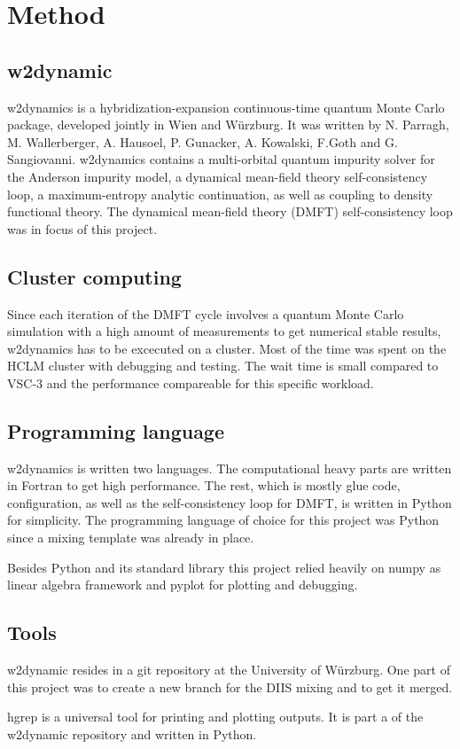 \chapter{Method}
\label{ch:method}

\section{w2dynamic}

w2dynamics\cite{w2dyn} is a hybridization-expansion continuous-time quantum Monte Carlo package, developed jointly in Wien and Würzburg. It was written by N. Parragh, M. Wallerberger, A. Hausoel, P. Gunacker, A. Kowalski, F.Goth and G. Sangiovanni. w2dynamics contains a multi-orbital quantum impurity solver for the Anderson impurity model, a dynamical mean-field theory self-consistency loop, a maximum-entropy analytic continuation, as well as coupling to density functional theory. The dynamical mean-field theory (DMFT) self-consistency loop was in focus of this project.

\section{Cluster computing}

Since each iteration of the DMFT cycle involves a quantum Monte Carlo simulation with a high amount of measurements to get numerical stable results, w2dynamics has to be excecuted on a cluster. Most of the time was spent on the HCLM cluster with debugging and testing. The wait time is small compared to VSC-3 and the performance compareable for this specific workload.

\section{Programming language}

w2dynamics is written two languages. The computational heavy parts are written in Fortran to get high performance. The rest, which is mostly glue code, configuration, as well as the self-consistency loop for DMFT, is written in Python for simplicity. The programming language of choice for this project was Python since a mixing template was already in place.

Besides Python and its standard library this project relied heavily on numpy as linear algebra framework and pyplot for plotting and debugging.

\section{Tools}

w2dynamic resides in a git repository at the University of Würzburg. One part of this project was to create a new branch for the DIIS mixing and to get it merged.

hgrep is a universal tool for printing and plotting outputs. It is part a of the w2dynamic repository and written in Python.

